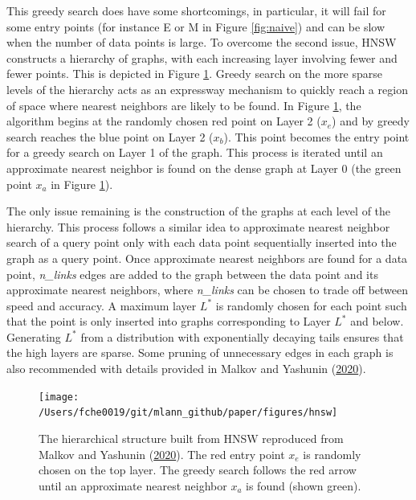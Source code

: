 \documentclass[12pt]{article}
\begin{document}
This greedy search does have some shortcomings, in particular, it will fail for some entry points (for instance E or M in Figure \ref{fig:naive}) and can be slow when the number of data points is large. To overcome the second issue, HNSW constructs a hierarchy of graphs, with each increasing layer involving fewer and fewer points. This is depicted in Figure \ref{fig:hnsw}. Greedy search on the more sparse levels of the hierarchy acts as an expressway mechanism to quickly reach a region of space where nearest neighbors are likely to be found. In Figure \ref{fig:hnsw}, the algorithm begins at the randomly chosen red point on Layer 2 (\(x_e\)) and by greedy search reaches the blue point on Layer 2 (\(x_b\)). This point becomes the entry point for a greedy search on Layer 1 of the graph. This process is iterated until an approximate nearest neighbor is found on the dense graph at Layer 0 (the green point \(x_a\) in Figure \ref{fig:hnsw}).

The only issue remaining is the construction of the graphs at each level of the hierarchy. This process follows a similar idea to approximate nearest neighbor search of a query point only with each data point sequentially inserted into the graph as a query point. Once approximate nearest neighbors are found for a data point, \textit{n\_links} edges are added to the graph between the data point and its approximate nearest neighbors, where \textit{n\_links} can be chosen to trade off between speed and accuracy. A maximum layer \(L^*\) is randomly chosen for each point such that the point is only inserted into graphs corresponding to Layer \(L^*\) and below. Generating \(L^*\) from a distribution with exponentially decaying tails ensures that the high layers are sparse. Some pruning of unnecessary edges in each graph is also recommended with details provided in Malkov and Yashunin (\protect\hyperlink{ref-Malkov2020-jp}{2020}).



\begin{figure}

{\centering \texttt{[image: /Users/fche0019/git/mlann\_github/paper/figures/hnsw]} 

}

\caption{The hierarchical structure built from HNSW reproduced from Malkov and Yashunin (\protect\hyperlink{ref-Malkov2020-jp}{2020}). The red entry point \(x_e\) is randomly chosen on the top layer. The greedy search follows the red arrow until an approximate nearest neighbor \(x_a\) is found (shown green).}\label{fig:hnsw}
\end{figure}
\end{document}
